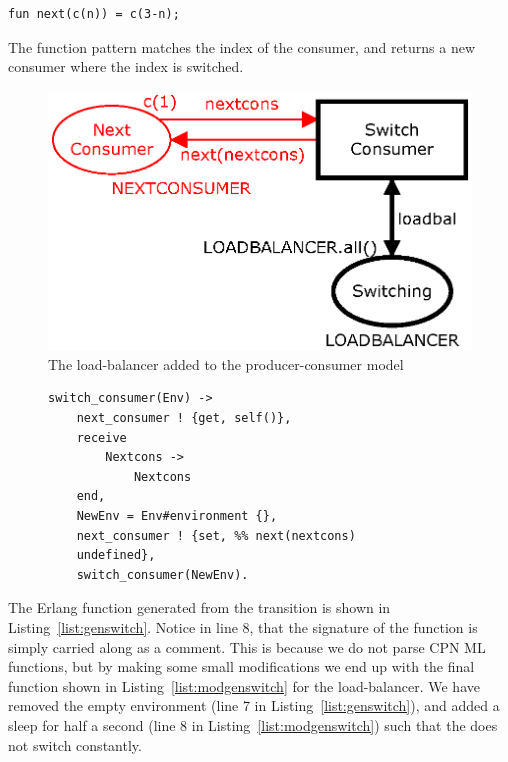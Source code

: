 \begin{verbatim}
fun next(c(n)) = c(3-n);
\end{verbatim}

\noindent
The function pattern matches the index  of the consumer, and returns a new consumer where the index is switched.

\begin{figure}
\centering
\includegraphics[scale=0.5]{techniques_and_tool/experiments/graphics/loadbalancer.eps}
\caption{The load-balancer added to the producer-consumer model}
\label{fig:loadbalancer}
\end{figure}

\begin{figure}[h!]
\begin{verbatim}
switch_consumer(Env) -> 
    next_consumer ! {get, self()},
    receive 
        Nextcons -> 
            Nextcons
    end,
    NewEnv = Env#environment {},
    next_consumer ! {set, %% next(nextcons)
    undefined},
    switch_consumer(NewEnv).
\end{verbatim}
\end{figure}

The Erlang function generated from the transition  is shown in Listing~\ref{list:genswitch}. Notice in line 8, that the signature of the function is simply carried along as a comment. This is because we do not parse CPN ML functions, but by making some small modifications we end up with the final  function shown in Listing~\ref{list:modgenswitch} for the load-balancer. We have removed the empty  environment (line 7 in Listing~\ref{list:genswitch}), and added a sleep for half a second (line 8 in Listing~\ref{list:modgenswitch}) such that the  does not switch constantly. 

